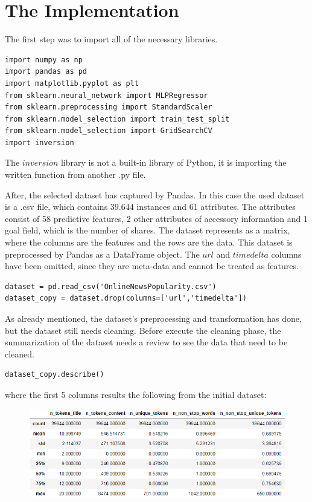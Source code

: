 \section{The Implementation}

The first step was to import all of the necessary libraries.
\begin{lstlisting}
import numpy as np
import pandas as pd
import matplotlib.pyplot as plt
from sklearn.neural_network import MLPRegressor
from sklearn.preprocessing import StandardScaler
from sklearn.model_selection import train_test_split
from sklearn.model_selection import GridSearchCV
import inversion
\end{lstlisting}
The $inversion$ library is not a built-in library of Python, it is importing the written function from another .py file.\smallskip

After, the selected dataset has captured by Pandas. In this case the used dataset is a .csv file, which contains 39.644 instances and 61 attributes. The attributes consist of 58 predictive features, 2 other attributes of accessory information and 1 goal field, which is the number of shares. The dataset represents as a matrix, where the columns are the features and the rows are the data. This dataset is preprocessed by Pandas as a DataFrame object. The $url$ and $timedelta$ columns have been omitted, since they are meta-data and cannot be treated as features. 
\begin{lstlisting}
dataset = pd.read_csv('OnlineNewsPopularity.csv')
dataset_copy = dataset.drop(columns=['url','timedelta'])
\end{lstlisting}

\medskip As already mentioned, the dataset's preprocessing and transformation has done, but the dataset still needs cleaning. Before execute the cleaning phase, the summarization of the dataset needs a review to see the data that need to be cleaned.
\begin{lstlisting}
dataset_copy.describe()
\end{lstlisting}
where the first 5 columns results the following from the initial dataset:
\begin{figure}[h]
	\centering
	\includegraphics[height=0.34\linewidth]{./figures/describe1}
	\label{fig:describe1}
\end{figure}

